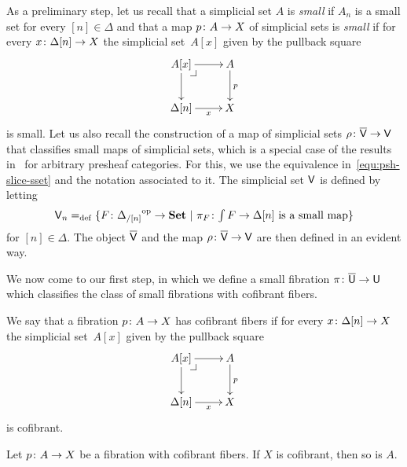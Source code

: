 \documentclass[reqno,10pt,a4paper,oneside,draft]{amsart}
\begin{document}
\medskip

As a preliminary step, let us recall that a simplicial set $A$ is \emph{small}  if $A_n$ is a small set for every $[n] \in \Delta$ and that a map $p \colon A \to X$ of simplicial sets is \emph{small} if for every $x \colon \Delta[n] 
\to X$ the simplicial set~$A[x]$ given by the pullback square
\[
\xymatrix{
A[x] \ar[r] \ar[d] \drpullback & A \ar[d]^{p} \\
\Delta[n] \ar[r]_-{x} & X }
\]
is small. Let us also recall the  construction of a map of simplicial sets $\rho \colon \overline{\mathsf{V}} \to \mathsf{V}$ that classifies
small maps of simplicial sets, which is a special case of the results in~\cite{hofmann-streicher-universes} for arbitrary presheaf categories.  For this, we use the equivalence in~\eqref{equ:psh-slice-sset} and the notation associated to it.
The simplicial set $\mathsf{V}$ is defined by letting
\[
\mathsf{V}_n =_{\operatorname{def}} \{ F \colon {\Delta_{/[n]}}^{\operatorname{op}} \to \mathbf{Set} \ | \ \pi_F \colon \textstyle{\int F} \to \Delta[n] \text{ is a small
map} \}
\]
for $[n] \in \Delta$. The object $\overline{\mathsf{V}}$ and the map $\rho \colon \overline{\mathsf{V}} \to \mathsf{V}$ are then defined in an evident way. 


\bigskip

We now come to our first step, in which we define a small fibration $\pi \colon \overline{\mathsf{U}} \to \mathsf{U}$ which 
classifies the class of small fibrations with cofibrant fibers. 

\begin{definition} We say that a fibration $p \colon A \to X$ has cofibrant fibers if for every $x \colon \Delta[n] 
\to X$ the simplicial set~$A[x]$ given by the pullback square
\[
\xymatrix{
A[x] \ar[r] \ar[d] \drpullback & A \ar[d]^{p} \\
\Delta[n] \ar[r]_-{x} & X }
\]
is cofibrant.
\end{definition}


\begin{lemma} Let $p \colon A \to X$ be a fibration with cofibrant fibers. If $X$ is cofibrant, then
so is $A$.
\end{lemma} 
\end{document}
